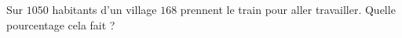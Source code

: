 
\begin{exercice}\label{exo2smath-0014}

    Sur \( 1050\) habitants d'un village \( 168\) prennent le train pour aller travailler. Quelle pourcentage cela fait ?

\end{exercice}
